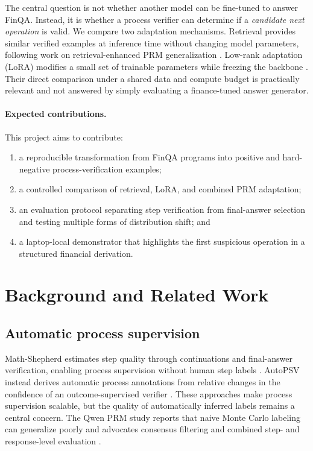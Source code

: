 \documentclass[10pt,twocolumn]{article}
\begin{document}
The central question is not whether another model can be fine-tuned to answer FinQA. Instead, it is whether a process verifier can determine if a \emph{candidate next operation} is valid. We compare two adaptation mechanisms. Retrieval provides similar verified examples at inference time without changing model parameters, following work on retrieval-enhanced PRM generalization \citep{retrievalprm2025}. Low-rank adaptation (LoRA) modifies a small set of trainable parameters while freezing the backbone \citep{lora2022}. Their direct comparison under a shared data and compute budget is practically relevant and not answered by simply evaluating a finance-tuned answer generator.

\paragraph{Expected contributions.}
This project aims to contribute:
\begin{enumerate}
  \item a reproducible transformation from FinQA programs into positive and hard-negative process-verification examples;
  \item a controlled comparison of retrieval, LoRA, and combined PRM adaptation;
  \item an evaluation protocol separating step verification from final-answer selection and testing multiple forms of distribution shift; and
  \item a laptop-local demonstrator that highlights the first suspicious operation in a structured financial derivation.
\end{enumerate}

\section{Background and Related Work}
\subsection{Automatic process supervision}
Math-Shepherd estimates step quality through continuations and final-answer verification, enabling process supervision without human step labels \citep{mathshepherd2024}. AutoPSV instead derives automatic process annotations from relative changes in the confidence of an outcome-supervised verifier \citep{autopsv2024}. These approaches make process supervision scalable, but the quality of automatically inferred labels remains a central concern. The Qwen PRM study reports that naive Monte Carlo labeling can generalize poorly and advocates consensus filtering and combined step- and response-level evaluation \citep{lessonsprm2025}.
\end{document}
